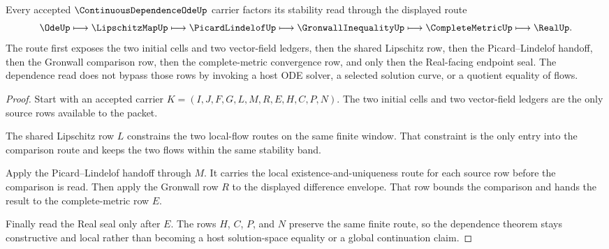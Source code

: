 \begin{theorem}
\label{thm:continuous-dependence-ode-gronwall-route}
Every accepted $\ContinuousDependenceOdeUp$ carrier factors its stability read through the displayed route
$$
\OdeUp \longmapsto \LipschitzMapUp \longmapsto \PicardLindelofUp \longmapsto \GronwallInequalityUp \longmapsto \CompleteMetricUp \longmapsto \RealUp .
$$
The route first exposes the two initial cells and two vector-field ledgers, then the shared Lipschitz row, then the Picard--Lindelof handoff, then the Gronwall comparison row, then the complete-metric convergence row, and only then the Real-facing endpoint seal. The dependence read does not bypass those rows by invoking a host ODE solver, a selected solution curve, or a quotient equality of flows.
\end{theorem}
\begin{proof}
Start with an accepted carrier $K=(I,J,F,G,L,M,R,E,H,C,P,N)$. The two initial cells and two vector-field ledgers are the only source rows available to the packet.

The shared Lipschitz row $L$ constrains the two local-flow routes on the same finite window. That constraint is the only entry into the comparison route and keeps the two flows within the same stability band.

Apply the Picard--Lindelof handoff through $M$. It carries the local existence-and-uniqueness route for each source row before the comparison is read. Then apply the Gronwall row $R$ to the displayed difference envelope. That row bounds the comparison and hands the result to the complete-metric row $E$.

Finally read the Real seal only after $E$. The rows $H$, $C$, $P$, and $N$ preserve the same finite route, so the dependence theorem stays constructive and local rather than becoming a host solution-space equality or a global continuation claim.
\end{proof}

